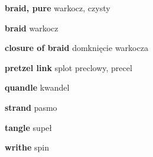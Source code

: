\item \textbf{braid, pure} warkocz, czysty
\item \textbf{braid} warkocz
\item \textbf{closure of braid} domknięcie warkocza
\item \textbf{pretzel link} splot preclowy, precel
\item \textbf{quandle} kwandel
\item \textbf{strand} pasmo
\item \textbf{tangle} supeł
\item \textbf{writhe} spin
